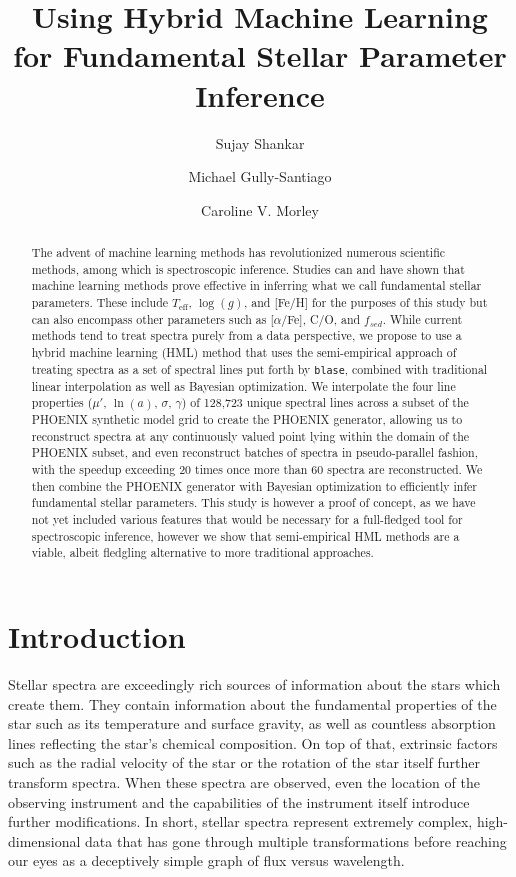 \documentclass[twocolumn]{aastex631}
\begin{document}
\title{Using Hybrid Machine Learning for Fundamental Stellar Parameter Inference}
\author[0000-0002-2290-6810]{Sujay Shankar}
\author[0000-0002-4020-3457]{Michael Gully-Santiago}
\author[0000-0002-4404-0456]{Caroline V. Morley}


\begin{abstract}
    The advent of machine learning methods has revolutionized 
    numerous scientific methods, among which is spectroscopic 
    inference. Studies can and have shown that machine learning 
    methods prove effective in inferring what we call
    fundamental stellar parameters. These include $T_{\mathrm{eff}}$,
    $\log(g)$, and [Fe/H] for the purposes of this study but can 
    also encompass other parameters such as [$\alpha$/Fe], C/O, and
    $f_{sed}$. While current methods tend to treat spectra purely
    from a data perspective, we propose to use a hybrid machine 
    learning (HML) method that uses the semi-empirical approach 
    of treating spectra as a set of spectral lines put forth by 
    \texttt{blase}, combined with traditional linear interpolation 
    as well as Bayesian optimization. We interpolate the four 
    line properties ($\mu'$, $\ln(a)$, $\sigma$, $\gamma$) of 
    128,723 unique spectral lines across a subset of the PHOENIX
    synthetic model grid to create the PHOENIX generator, allowing
    us to reconstruct spectra at any continuously valued point 
    lying within the domain of the PHOENIX subset, and even reconstruct 
    batches of spectra in pseudo-parallel fashion, with the speedup 
    exceeding 20 times once more than 60 spectra are reconstructed. 
    We then combine the PHOENIX generator with Bayesian optimization to 
    efficiently infer fundamental stellar parameters. This study is 
    however a proof of concept, as we have not yet included various
    features that would be necessary for a full-fledged tool for 
    spectroscopic inference, however we show that semi-empirical 
    HML methods are a viable, albeit fledgling alternative to 
    more traditional approaches.
\end{abstract}

\section{Introduction}
Stellar spectra are exceedingly rich sources of information about the stars
which create them. They contain information about the fundamental properties
of the star such as its temperature and surface gravity, as well as
countless absorption lines reflecting the star's chemical composition. On 
top of that, extrinsic factors such as the radial velocity of the star or 
the rotation of the star itself further transform spectra. When these spectra
are observed, even the location of the observing instrument and the 
capabilities of the instrument itself introduce further modifications. 
In short, stellar spectra represent extremely complex, high-dimensional 
data that has gone through multiple transformations before reaching our 
eyes as a deceptively simple graph of flux versus wavelength.
\end{document}
